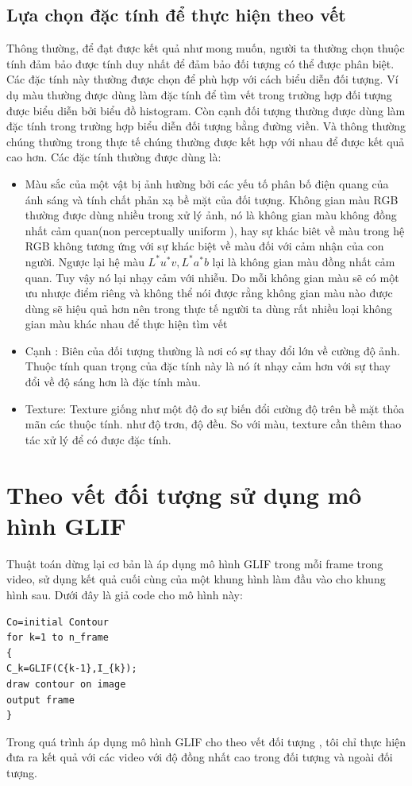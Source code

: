 \documentclass[12pt, oneside, a4]{book}
\begin{document}
\subsection{Lựa chọn đặc tính để thực hiện theo vết}
Thông thường, để đạt được kết quả như mong muốn, người ta thường chọn thuộc tính đảm bảo được tính duy nhất để đảm bảo đối tượng có thể được phân biệt. Các đặc tính này thường được chọn để phù hợp với cách biểu diễn đối tượng. Ví dụ màu thường được dùng làm đặc tính để tìm vết trong trường hợp đối tượng được biểu diễn bởi biểu đồ histogram. Còn cạnh đối tượng thường được dùng làm đặc tính trong trường hợp biểu diễn đối tượng bằng đường viền. Và thông thường chúng thường trong thực tế chúng thường được kết hợp với nhau để được kết quả cao hơn. Các đặc tính thường được dùng là:
\begin{itemize}

\item Màu sắc của một vật bị ảnh hường bởi các yếu tố  phân bố điện quang của ánh sáng và tính chất phản xạ bề mặt của đối tượng. Không gian màu RGB thường được dùng nhiều trong xử lý ảnh, nó là không gian màu không đồng nhất cảm quan(non perceptually uniform ), hay sự khác biêt về màu trong hệ RGB không tương ứng với sự khác biệt về màu đối với cảm nhận của con người. Ngược lại hệ màu $L^*u^*v, L^*a^*b$ lại là không gian màu đồng nhất cảm quan. Tuy vậy nó lại nhạy cảm với nhiễu. Do  mỗi không gian màu sẽ có một ưu nhược điểm riêng và không thể nói được rằng không gian màu nào được dùng sẽ hiệu quả hơn nên trong thực tế người ta dùng rất nhiều loại không gian màu khác nhau để thực hiện tìm vết
\item Cạnh : Biên của đối tượng thường là nơi có sự thay đổi lớn về cường độ ảnh. Thuộc tính quan trọng của đặc tính này là nó ít nhạy cảm hơn với sự thay đổi về độ sáng hơn là đặc tính màu. 

\item Texture: Texture giống như một độ đo sự biến đổi cường độ trên bề mặt thỏa mãn các thuộc tính. như độ trơn, độ đều. So với màu, texture cần thêm thao tác xử lý để có được đặc tính. 

\end{itemize}
\section{Theo vết đối tượng sử dụng mô hình GLIF}
Thuật toán dừng lại cơ bản là áp dụng mô hình GLIF trong mỗi frame trong video, sử dụng kết quả cuối cùng của một khung hình làm đầu vào cho khung hình sau. Dưới đây là giả code cho mô hình này:
\begin{lstlisting}
Co=initial Contour
for k=1 to n_frame 
{
C_k=GLIF(C{k-1},I_{k});
draw contour on image
output frame
}

\end{lstlisting}
Trong quá trình áp dụng mô hình GLIF cho theo vết đối tượng  , tôi chỉ thực hiện đưa ra kết quả với các video với độ đồng nhất cao trong đối tượng và ngoài đối tượng.  
\end{document}
